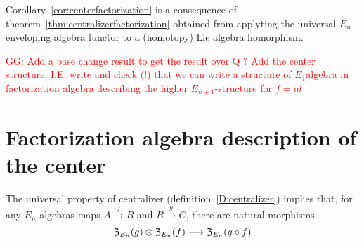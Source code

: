 \documentclass[11pt]{amsart}
\numberwithin{equation}{section}
\def\greg{\textcolor{red}{GG: }\textcolor{red}}
\begin{document}
\smallskip 

Corollary~\ref{cor:centerfactorization}  is a consequence of theorem~\ref{thm:centralizerfactorization} obtained from applyting the universal 
$E_n$-enveloping algebra functor to a (homotopy) Lie algebra homorphism.

\greg{Add a base change result to get the result over Q ? Add the center structure. I.E. write and check (!) that we can write a structure of $E_1$algebra in factorization algebra describing the higher $E_{n+1}$-structure for $f=id$} 

\section{Factorization algebra description of the center}\label{S:centerinFacAlg}
The universal property of centralizer (definition~\ref{D:centralizer}) implies that, for any $E_n$-algebras maps $A\stackrel{f}\to B$ and
$B\stackrel{g}\to C$, there are natural morphisms
\begin{equation}\label{eqdef:canonicaltocentralizers} {\frak Z}_{E_n}(g) \otimes {\frak Z}_{E_n}(f) \longrightarrow {\frak Z}_{E_n}(g\circ f)
\end{equation}
 
\end{document}
